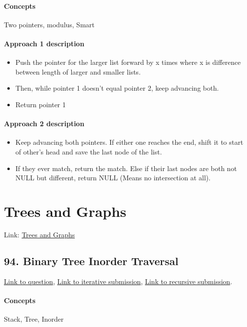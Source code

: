 \documentclass[11pt]{book}
\begin{document}
\paragraph{Concepts}
Two pointers, modulus, Smart
\paragraph{Approach 1 description}
\begin{itemize}
    \item Push the pointer for the larger list forward by x times where x is difference between length of larger and smaller lists.
    \item Then, while pointer 1 doesn't equal pointer 2, keep advancing both.
    \item Return pointer 1
\end{itemize}
\paragraph{Approach 2 description}
\begin{itemize}
    \item Keep advancing both pointers. If either one reaches the end, shift it to start of other's head and save the last node of the list.
    \item If they ever match, return the match. Else if their last nodes are both not NULL but different, return NULL (Means no intersection at all).
\end{itemize}

\section{Trees and Graphs}
Link: \href{https://leetcode.com/explore/interview/card/top-interview-questions-medium/108/trees-and-graphs/}{Trees and Graphs}

\subsection{94. Binary Tree Inorder Traversal}
\href{https://leetcode.com/problems/binary-tree-inorder-traversal/}{Link to question},
\href{https://leetcode.com/submissions/detail/338200298/}{Link to iterative submission},
\href{https://leetcode.com/submissions/detail/338194239/}{Link to recursive submission}.
\paragraph{Concepts}
Stack, Tree, Inorder
\end{document}
